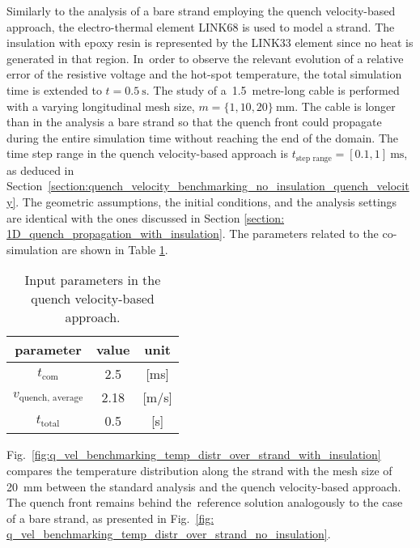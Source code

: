 
Similarly to the analysis of a bare strand employing the quench velocity-based approach, the electro-thermal element LINK68 is used to model a strand. The insulation with epoxy resin is represented by the LINK33 element since no heat is generated in that region. In~order to observe the relevant evolution of a relative error of the resistive voltage and the hot-spot temperature, the total simulation time is extended to $t=0.5~\text{s}$. The study of a~1.5~metre-long cable is performed with a varying longitudinal mesh size, $m=\{1, 10, 20\}~\text{mm}$. The cable is longer than in the analysis a bare strand so that the quench front could propagate during the entire simulation time without reaching the end of the domain. The time step range in the quench velocity-based approach is $t_\text{step range}=[0.1, 1]~\text{ms}$, as deduced in Section~\ref{section:quench_velocity_benchmarking_no_insulation_quench_velocity}. The geometric assumptions, the initial conditions, and the analysis settings are identical with the ones discussed in Section \ref{section: 1D_quench_propagation_with_insulation}. The parameters related to the co-simulation are shown in Table \ref{table:1d_qv_benchmarking_geometry__with_insulation_parameters_quench_velocity}. 

\begin{table}[H]
    \caption{Input parameters in the quench velocity-based approach.} 
    \vspace{-1.em} 
    \fontsize{10}{10}
    \selectfont 
    \renewcommand{\arraystretch}{1.5}
    \begin{center}
        \begin{tabular}{ ccc }  
        \hline
        parameter & value & unit \\
        \hline
        $t_\text{com}$ & 2.5 & [ms] \\
        $v_\text{quench, average}$ & 2.18 & [m/s] \\
        $t_\text{total}$ & 0.5 & [s] \\
        \hline 
        \end{tabular}
    \end{center}  
    \label{table:1d_qv_benchmarking_geometry__with_insulation_parameters_quench_velocity} 
\end{table}

Fig.~\ref{fig:q_vel_benchmarking_temp_distr_over_strand_with_insulation} compares the temperature distribution along the strand with the mesh size of 20~mm between the standard analysis and the quench velocity-based approach. The quench front remains behind the~reference solution analogously to the case of a bare strand, as presented in Fig.~\ref{fig: q_vel_benchmarking_temp_distr_over_strand_no_insulation}.

